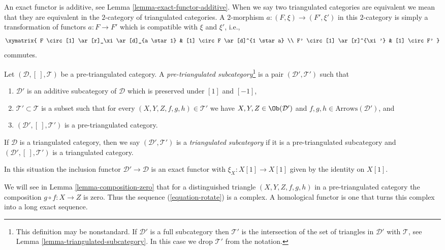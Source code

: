 \noindent
An exact functor is additive, see
Lemma \ref{lemma-exact-functor-additive}.
When we say two triangulated categories are equivalent we mean that
they are equivalent in the $2$-category of triangulated categories.
A $2$-morphism $a : (F, \xi) \to (F', \xi')$ in this $2$-category is
simply a transformation of functors $a : F \to F'$ which is compatible
with $\xi$ and $\xi'$, i.e.,
$$
\xymatrix{
F \circ [1] \ar[r]_\xi \ar[d]_{a \star 1} & [1] \circ F \ar[d]^{1 \star a} \\
F' \circ [1] \ar[r]^{\xi'} & [1] \circ F'
}
$$
commutes.

\begin{definition}
\label{definition-triangulated-subcategory}
Let $(\mathcal{D}, [\ ], \mathcal{T})$ be a pre-triangulated category.
A {\it pre-triangulated subcategory}\footnote{This definition may be
nonstandard. If $\mathcal{D}'$ is a full subcategory then $\mathcal{T}'$
is the intersection of the set of triangles in $\mathcal{D}'$ with
$\mathcal{T}$, see
Lemma \ref{lemma-triangulated-subcategory}.
In this case we drop $\mathcal{T}'$ from the notation.}
is a pair $(\mathcal{D}', \mathcal{T}')$ such that
\begin{enumerate}
\item $\mathcal{D}'$ is an additive subcategory of $\mathcal{D}$
which is preserved under $[1]$ and $[-1]$,
\item $\mathcal{T}' \subset \mathcal{T}$ is a subset such that for every
$(X, Y, Z, f, g, h) \in \mathcal{T}'$ we have
$X, Y, Z \in \Ob(\mathcal{D}')$ and
$f, g, h \in \text{Arrows}(\mathcal{D}')$, and
\item $(\mathcal{D}', [\ ], \mathcal{T}')$ is a pre-triangulated
category.
\end{enumerate}
If $\mathcal{D}$ is a triangulated category, then we say
$(\mathcal{D}', \mathcal{T}')$ is a {\it triangulated subcategory} if
it is a pre-triangulated subcategory and
$(\mathcal{D}', [\ ], \mathcal{T}')$ is a triangulated category.
\end{definition}

\noindent
In this situation the inclusion functor
$\mathcal{D}' \to \mathcal{D}$ is an exact functor
with $\xi_X : X[1] \to X[1]$ given by the identity on $X[1]$.

\medskip\noindent
We will see in
Lemma \ref{lemma-composition-zero}
that for a distinguished triangle $(X, Y, Z, f, g, h)$
in a pre-triangulated category the composition $g \circ f : X \to Z$ is zero.
Thus the sequence (\ref{equation-rotate}) is a complex.
A homological functor is one that turns this complex into a long
exact sequence.

